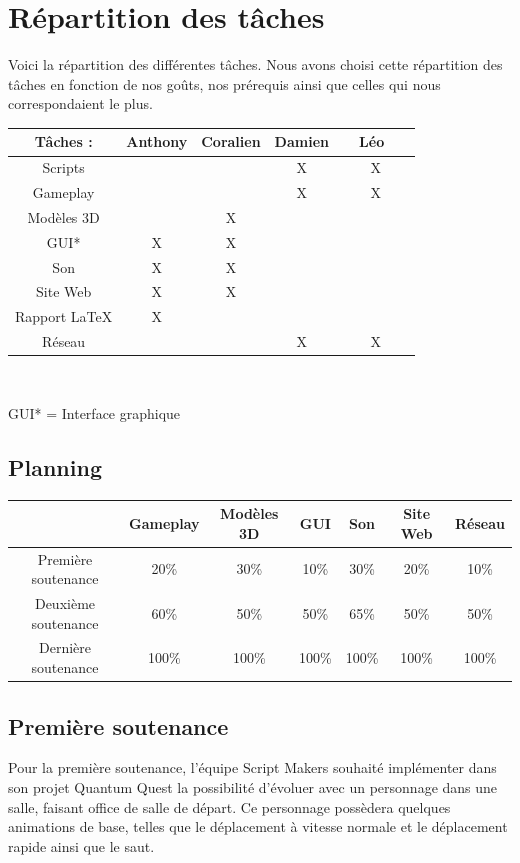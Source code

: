 \documentclass[A4paper,11pt]{article}
\begin{document}
\section{R\'epartition des t\^aches}
Voici la r\'epartition des diff\'erentes t\^aches. Nous avons choisi cette r\'epartition des t\^aches en fonction de nos go\^uts, nos pr\'erequis ainsi que celles qui nous correspondaient le plus.\\
\begin{center}
\begin{tabular}{|c|c|c|c|c|}
\hline
T\^aches : & Anthony & Coralien & Damien & ~~L\'eo~~~\\
\hline
Scripts &   &   & X & X\\
\hline
Gameplay &   &   & X & X\\
\hline
Mod\`eles 3D &   & X &   &  \\
\hline
GUI* & X & X  &  & \\
\hline
Son & X & X &   &  \\
\hline
Site Web & X & X &   &  \\
\hline
Rapport LaTeX & X &   &   &  \\
\hline
R\'eseau & & & X & X\\
\hline
\end{tabular}\\
\end{center}
GUI* = Interface graphique
\begin{center}
\section{Planning}
\begin{tabular}{|c|c|c|c|c|c|c|}
\hline
 & Gameplay & Mod\`eles 3D & GUI & Son & Site Web & R\'eseau\\
\hline
Premi\`ere soutenance & 20\% & 30\% & 10\% & 30\% & 20\% & 10\%\\
\hline
Deuxi\`eme soutenance & 60\% & 50\% & 50\% & 65\% & 50\% & 50\%\\
\hline
Derni\`ere soutenance &100\% & 100\% & 100\% & 100\% & 100\% & 100\%\\
\hline
\end{tabular}
\end{center}
\subsection{Premi\`ere soutenance}
Pour la premi\`ere soutenance, l'\'equipe Script Makers souhait\'e implémenter dans son projet Quantum Quest la possibilit\'e d'\'evoluer avec un personnage dans une salle, faisant office de salle de d\'epart. Ce personnage poss\`edera quelques animations de base, telles que le d\'eplacement \`a vitesse normale et le d\'eplacement rapide ainsi que le saut.\\ 
\end{document}
